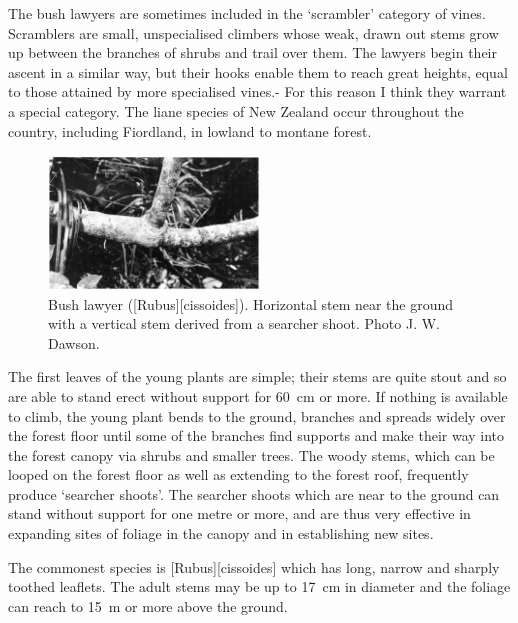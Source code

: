 The bush lawyers are sometimes included in the `scrambler' category of vines.
Scramblers are small, unspecialised climbers whose weak, drawn out stems grow up between the branches of shrubs and trail over them.
The lawyers begin their ascent in a similar way, but their hooks enable them to reach great heights, equal to those attained by more specialised vines.- For this reason I think they warrant a special category.
The liane species of New Zealand  occur throughout the country, including Fiordland, in lowland to montane forest.

\begin{figure}
	\includegraphics[width=0.5\textwidth]{graphics/figure36bushlawyer.jpg}
	\centering
	\caption[Bush lawyer]{Bush lawyer ([Rubus][cissoides]).
	Horizontal stem near the ground with a vertical stem derived from a searcher shoot.
	Photo  J. W. Dawson.}%
	\label{fig:36bushlawyer}
\end{figure}

The first leaves of the young plants are simple; their stems are quite stout and so are able to stand erect without support for \SI{60}{\centi\metre} or more.
If nothing is available to climb, the young plant bends to the ground, branches and spreads widely over the forest floor until some of the branches find supports and make their way into the forest canopy via shrubs and smaller trees.
The woody stems, which can be looped on the forest floor as well as extending to the forest roof, frequently produce `searcher shoots'.
The searcher shoots which are near to the ground can stand without support for one metre or more, and are thus very effective in expanding sites of  foliage in the canopy and in establishing new sites.

The commonest species is [Rubus][cissoides] which has long, narrow and sharply toothed leaflets.
The adult stems may be up to \SI{17}{\centi\metre} in diameter and the foliage can reach to \SI{15}{\metre} or more above the ground.

